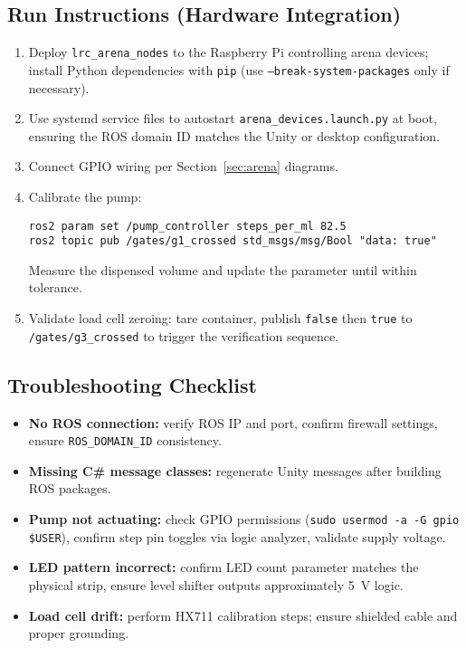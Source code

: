 \documentclass[12pt]{article}
\begin{document}
\subsection{Run Instructions (Hardware Integration)}
\begin{enumerate}
    \item Deploy \texttt{lrc\_arena\_nodes} to the Raspberry Pi controlling arena devices; install Python dependencies with \texttt{pip} (use \texttt{--break-system-packages} only if necessary).
    \item Use systemd service files to autostart \texttt{arena\_devices.launch.py} at boot, ensuring the ROS domain ID matches the Unity or desktop configuration.
    \item Connect GPIO wiring per Section~\ref{sec:arena} diagrams.
    \item Calibrate the pump:
    \begin{verbatim}
ros2 param set /pump_controller steps_per_ml 82.5
ros2 topic pub /gates/g1_crossed std_msgs/msg/Bool "data: true"
    \end{verbatim}
    Measure the dispensed volume and update the parameter until within tolerance.
    \item Validate load cell zeroing: tare container, publish \texttt{false} then \texttt{true} to \texttt{/gates/g3\_crossed} to trigger the verification sequence.
\end{enumerate}

\subsection{Troubleshooting Checklist}
\begin{itemize}
    \item \textbf{No ROS connection:} verify ROS IP and port, confirm firewall settings, ensure \texttt{ROS\_DOMAIN\_ID} consistency.
    \item \textbf{Missing C\# message classes:} regenerate Unity messages after building ROS packages.
    \item \textbf{Pump not actuating:} check GPIO permissions (\texttt{sudo usermod -a -G gpio \$USER}), confirm step pin toggles via logic analyzer, validate supply voltage.
    \item \textbf{LED pattern incorrect:} confirm LED count parameter matches the physical strip, ensure level shifter outputs approximately 5~V logic.
    \item \textbf{Load cell drift:} perform HX711 calibration steps; ensure shielded cable and proper grounding.
\end{itemize}
\end{document}
